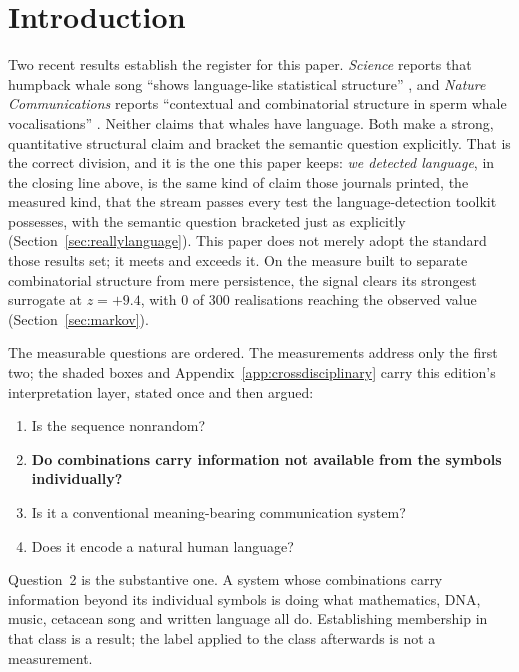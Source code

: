 \documentclass[11pt,a4paper]{article}
\begin{document}
\begin{abstract}
\smallskip
\noindent
\textbf{We detected a protocol. We stripped it. We detected language.}
\end{abstract}


\section{Introduction}

Two recent results establish the register for this paper. \emph{Science} reports that
humpback whale song ``shows language-like statistical structure'' \cite{arnon2025}, and
\emph{Nature Communications} reports ``contextual and combinatorial structure in sperm
whale vocalisations'' \cite{sharma2024}. Neither claims that whales have language.
Both make a strong, quantitative structural claim and bracket the semantic question
explicitly. That is the correct division, and it is the one this paper keeps:
\emph{we detected language}, in the closing line above, is the same kind of claim
those journals printed, the measured kind, that the stream passes every test the
language-detection toolkit possesses, with the semantic question bracketed just as
explicitly (Section~\ref{sec:reallylanguage}). This paper does not merely adopt the
standard those results set; it meets and exceeds it. On the measure built to separate
combinatorial structure from mere persistence, the signal clears its strongest
surrogate at $z = +9.4$, with 0 of 300 realisations reaching the observed value
(Section~\ref{sec:markov}).

The measurable questions are ordered. The measurements address only the first two;
the shaded boxes and Appendix~\ref{app:crossdisciplinary} carry this edition's
interpretation layer, stated once and then argued:

\begin{enumerate}[leftmargin=1.6em,itemsep=1pt]
\item Is the sequence nonrandom?
\item \textbf{Do combinations carry information not available from the symbols
individually?}
\item Is it a conventional meaning-bearing communication system?
\item Does it encode a natural human language?
\end{enumerate}

Question~2 is the substantive one. A system whose combinations carry information beyond
its individual symbols is doing what mathematics, DNA, music, cetacean song and written
language all do. Establishing membership in that class is a result; the label applied to
the class afterwards is not a measurement.
\end{document}

